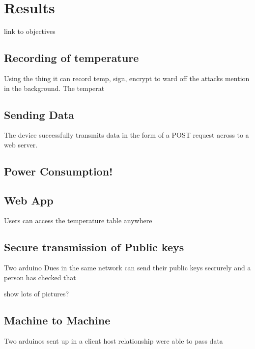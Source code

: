 \chapter{Results}
\label{res}

link to objectives

\section{Recording of temperature}

Using the thing it can record temp, sign, encrypt to ward off the attacks mention in the background. The temperat

\section{Sending Data}

The device successfully transmits data in the form of a POST request across to a web server.
\section{Power Consumption!}

\section{Web App}

Users can access the temperature table anywhere 

\section{Secure transmission of Public keys}

Two arduino Dues in the same network can send their public keys secrurely and a person has checked that

show lots of pictures?

\section{Machine to Machine}

Two arduinos sent up in a client host relationship were able to pass data

